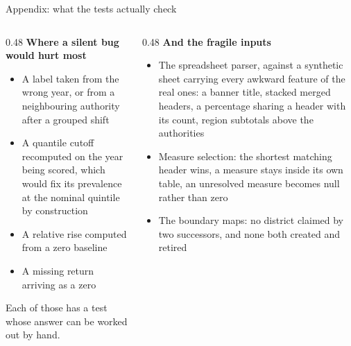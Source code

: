 \documentclass[aspectratio=169,11pt]{beamer}
\newcommand{\lead}[1]{{\color{seriesone}\bfseries #1}}
\newcommand{\smallcap}[1]{{\footnotesize\color{inktwo}#1}}
\begin{document}
\begin{frame}{Appendix: what the tests actually check}
  \begin{columns}[T,onlytextwidth]
    \begin{column}{0.48\textwidth}
      \footnotesize
      \lead{Where a silent bug would hurt most}
      \begin{itemize}
        \item A label taken from the wrong year, or from a neighbouring
              authority after a grouped shift
        \item A quantile cutoff recomputed on the year being scored, which
              would fix its prevalence at the nominal quintile by construction
        \item A relative rise computed from a zero baseline
        \item A missing return arriving as a zero
      \end{itemize}
      \vspace{1mm}

      \smallcap{Each of those has a test whose answer can be worked out by
      hand.}
    \end{column}
    \begin{column}{0.48\textwidth}
      \footnotesize
      \lead{And the fragile inputs}
      \begin{itemize}
        \item The spreadsheet parser, against a synthetic sheet carrying every
              awkward feature of the real ones: a banner title, stacked merged
              headers, a percentage sharing a header with its count, region
              subtotals above the authorities
        \item Measure selection: the shortest matching header wins, a measure
              stays inside its own table, an unresolved measure becomes null
              rather than zero
        \item The boundary maps: no district claimed by two successors, and
              none both created and retired
      \end{itemize}
    \end{column}
  \end{columns}
\end{frame}
\end{document}
